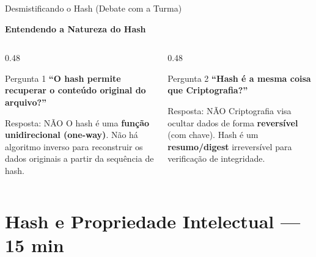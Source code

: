 \documentclass[9pt]{beamer}
\begin{document}
\begin{frame}{Desmistificando o Hash (Debate com a Turma)}
  \begin{center}
    \large\color{structure.fg}\textbf{Entendendo a Natureza do Hash}
  \end{center}

  \vspace{0.2cm}

  \begin{columns}[T]
    \begin{column}{0.48\textwidth}
      \begin{alertblock}{Pergunta 1}
        \small
        \textbf{“O hash permite recuperar o conteúdo original do arquivo?”}
      \end{alertblock}
      \vspace{0.1cm}
      \begin{block}{Resposta: NÃO}
        \small
        O hash é uma \textbf{função unidirecional (one-way)}. Não há algoritmo inverso para reconstruir os dados originais a partir da sequência de hash.
      \end{block}
    \end{column}

    \begin{column}{0.48\textwidth}
      \begin{alertblock}{Pergunta 2}
        \small
        \textbf{“Hash é a mesma coisa que Criptografia?”}
      \end{alertblock}
      \vspace{0.1cm}
      \begin{block}{Resposta: NÃO}
        \small
        Criptografia visa ocultar dados de forma \textbf{reversível} (com chave). Hash é um \textbf{resumo/digest} irreversível para verificação de integridade.
      \end{block}
    \end{column}
  \end{columns}
\end{frame}

\section{Hash e Propriedade Intelectual — 15 min}
\end{document}
